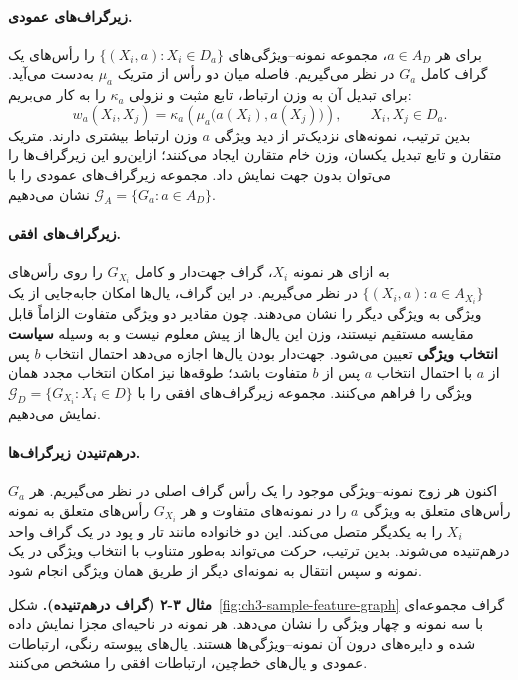 \paragraph{زیرگراف‌های عمودی.}
برای هر $a\in A_D$، مجموعه نمونه--ویژگی‌های $\{(X_i,a):X_i\in D_a\}$ را رأس‌های یک گراف کامل $G_a$ در نظر می‌گیریم. فاصله میان دو رأس از متریک $\mu_a$ به‌دست می‌آید. برای تبدیل آن به وزن ارتباط، تابع مثبت و نزولی $\kappa_a$ را به کار می‌بریم:
\begin{equation}\label{eq:ch3-edge-weight}
w_a(X_i,X_j)=\kappa_a\!\left(\mu_a\bigl(a(X_i),a(X_j)\bigr)\right),
\qquad X_i,X_j\in D_a.
\end{equation}
بدین ترتیب، نمونه‌های نزدیک‌تر از دید ویژگی $a$ وزن ارتباط بیشتری دارند. متریک متقارن و تابع تبدیل یکسان، وزن خام متقارن ایجاد می‌کنند؛ ازاین‌رو این زیرگراف‌ها را می‌توان بدون جهت نمایش داد. مجموعه زیرگراف‌های عمودی را با $\mathcal G_A=\{G_a:a\in A_D\}$ نشان می‌دهیم.

\paragraph{زیرگراف‌های افقی.}
به ازای هر نمونه $X_i$، گراف جهت‌دار و کامل $G_{X_i}$ را روی رأس‌های $\{(X_i,a):a\in A_{X_i}\}$ در نظر می‌گیریم. در این گراف، یال‌ها امکان جابه‌جایی از یک ویژگی به ویژگی دیگر را نشان می‌دهند. چون مقادیر دو ویژگی متفاوت الزاماً قابل مقایسه مستقیم نیستند، وزن این یال‌ها از پیش معلوم نیست و به وسیله \textbf{سیاست انتخاب ویژگی} تعیین می‌شود. جهت‌دار بودن یال‌ها اجازه می‌دهد احتمال انتخاب $b$ پس از $a$ با احتمال انتخاب $a$ پس از $b$ متفاوت باشد؛ طوقه‌ها نیز امکان انتخاب مجدد همان ویژگی را فراهم می‌کنند. مجموعه زیرگراف‌های افقی را با $\mathcal G_D=\{G_{X_i}:X_i\in D\}$ نمایش می‌دهیم.

\paragraph{درهم‌تنیدن زیرگراف‌ها.}
اکنون هر زوج نمونه--ویژگی موجود را یک رأس گراف اصلی در نظر می‌گیریم. هر $G_a$ رأس‌های متعلق به ویژگی $a$ را در نمونه‌های متفاوت و هر $G_{X_i}$ رأس‌های متعلق به نمونه $X_i$ را به یکدیگر متصل می‌کند. این دو خانواده مانند تار و پود در یک گراف واحد درهم‌تنیده می‌شوند. بدین ترتیب، حرکت می‌تواند به‌طور متناوب با انتخاب ویژگی در یک نمونه و سپس انتقال به نمونه‌ای دیگر از طریق همان ویژگی انجام شود.

\noindent\textbf{مثال ۳-۲ (گراف درهم‌تنیده).}
شکل~\ref{fig:ch3-sample-feature-graph} گراف مجموعه‌ای با سه نمونه و چهار ویژگی را نشان می‌دهد. هر نمونه در ناحیه‌ای مجزا نمایش داده شده و دایره‌های درون آن نمونه--ویژگی‌ها هستند. یال‌های پیوسته رنگی، ارتباطات عمودی و یال‌های خط‌چین، ارتباطات افقی را مشخص می‌کنند.

